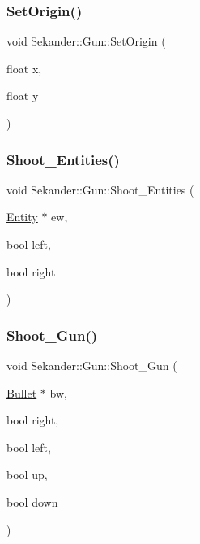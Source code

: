 \mbox{\label{classSekander_1_1Gun_aced0361bd919bc1221e55d06e8293a88}} 
\subsubsection{\texorpdfstring{Set\+Origin()}{SetOrigin()}}
{\footnotesize\ttfamily void Sekander\+::\+Gun\+::\+Set\+Origin (\begin{DoxyParamCaption}\item[{float}]{x,  }\item[{float}]{y }\end{DoxyParamCaption})\hspace{0.3cm}{\ttfamily [inline]}}

\mbox{\label{classSekander_1_1Gun_a3410d2e3352ec9cb6deb21deda8ff160}} 
\subsubsection{\texorpdfstring{Shoot\+\_\+\+Entities()}{Shoot\_Entities()}}
{\footnotesize\ttfamily void Sekander\+::\+Gun\+::\+Shoot\+\_\+\+Entities (\begin{DoxyParamCaption}\item[{\hyperlink{classSekander_1_1Entity}{Entity} $\ast$}]{ew,  }\item[{bool}]{left,  }\item[{bool}]{right }\end{DoxyParamCaption})}

\mbox{\label{classSekander_1_1Gun_a748d795cb18ae0fe6ecc6cb4f5841273}} 
\subsubsection{\texorpdfstring{Shoot\+\_\+\+Gun()}{Shoot\_Gun()}\hspace{0.1cm}{\footnotesize\ttfamily [1/3]}}
{\footnotesize\ttfamily void Sekander\+::\+Gun\+::\+Shoot\+\_\+\+Gun (\begin{DoxyParamCaption}\item[{\hyperlink{classSekander_1_1Bullet}{Bullet} $\ast$}]{bw,  }\item[{bool}]{right,  }\item[{bool}]{left,  }\item[{bool}]{up,  }\item[{bool}]{down }\end{DoxyParamCaption})}

